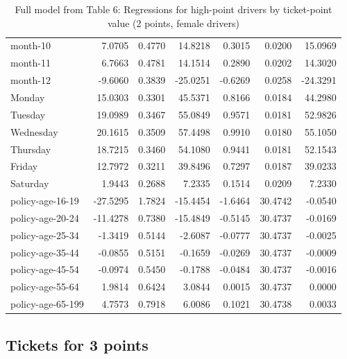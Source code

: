 \documentclass[10pt]{article}
\begin{document}
\begin{table}[ht]
\begin{tabular}{lrrrrrr}
  month-10 & 7.0705 & 0.4770 & 14.8218 & 0.3015 & 0.0200 & 15.0969 \\ 
  month-11 & 6.7663 & 0.4781 & 14.1514 & 0.2890 & 0.0202 & 14.3020 \\ 
  month-12 & -9.6060 & 0.3839 & -25.0251 & -0.6269 & 0.0258 & -24.3291 \\ 
  Monday & 15.0303 & 0.3301 & 45.5371 & 0.8166 & 0.0184 & 44.2980 \\ 
  Tuesday & 19.0989 & 0.3467 & 55.0849 & 0.9571 & 0.0181 & 52.9826 \\ 
  Wednesday & 20.1615 & 0.3509 & 57.4498 & 0.9910 & 0.0180 & 55.1050 \\ 
  Thursday & 18.7215 & 0.3460 & 54.1080 & 0.9441 & 0.0181 & 52.1543 \\ 
  Friday & 12.7972 & 0.3211 & 39.8496 & 0.7297 & 0.0187 & 39.0233 \\ 
  Saturday & 1.9443 & 0.2688 & 7.2335 & 0.1514 & 0.0209 & 7.2330 \\ 
  policy-age-16-19 & -27.5295 & 1.7824 & -15.4454 & -1.6464 & 30.4742 & -0.0540 \\ 
  policy-age-20-24 & -11.4278 & 0.7380 & -15.4849 & -0.5145 & 30.4737 & -0.0169 \\ 
  policy-age-25-34 & -1.3419 & 0.5144 & -2.6087 & -0.0777 & 30.4737 & -0.0025 \\ 
  policy-age-35-44 & -0.0855 & 0.5151 & -0.1659 & -0.0269 & 30.4737 & -0.0009 \\ 
  policy-age-45-54 & -0.0974 & 0.5450 & -0.1788 & -0.0484 & 30.4737 & -0.0016 \\ 
  policy-age-55-64 & 1.9814 & 0.6424 & 3.0844 & 0.0015 & 30.4737 & 0.0000 \\ 
  policy-age-65-199 & 4.7573 & 0.7918 & 6.0086 & 0.1021 & 30.4738 & 0.0033 \\ 
   \hline
\end{tabular}
\caption{Full model from Table 6: Regressions for high-point drivers by ticket-point value (2 points, female drivers)} 
\label{tab_6_2_pts_F}
\end{table}


\clearpage
\pagebreak




\subsection{Tickets for 3 points}
\end{document}
